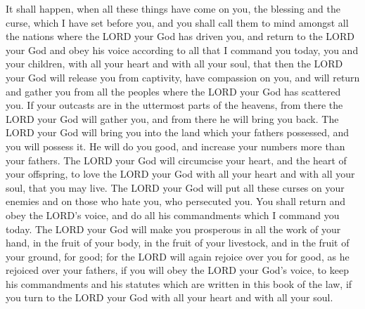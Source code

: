  It shall happen, when all these things have come on you,
the blessing and the curse, which I have set before you, and you shall
call them to mind amongst all the nations where the LORD your God has
driven you,  and return to the LORD your God and obey his
voice according to all that I command you today, you and your children,
with all your heart and with all your soul,  that then the
LORD your God will release you from captivity, have compassion on you,
and will return and gather you from all the peoples where the LORD your
God has scattered you.  If your outcasts are in the
uttermost parts of the heavens, from there the LORD your God will gather
you, and from there he will bring you back.  The LORD your
God will bring you into the land which your fathers possessed, and you
will possess it. He will do you good, and increase your numbers more
than your fathers.  The LORD your God will circumcise your
heart, and the heart of your offspring, to love the LORD your God with
all your heart and with all your soul, that you may live. 
The LORD your God will put all these curses on your enemies and on those
who hate you, who persecuted you.  You shall return and obey
the LORD's voice, and do all his commandments which I command you today.
 The LORD your God will make you prosperous in all the work
of your hand, in the fruit of your body, in the fruit of your livestock,
and in the fruit of your ground, for good; for the LORD will again
rejoice over you for good, as he rejoiced over your fathers,
 if you will obey the LORD your God's voice, to keep his
commandments and his statutes which are written in this book of the law,
if you turn to the LORD your God with all your heart and with all your
soul.

